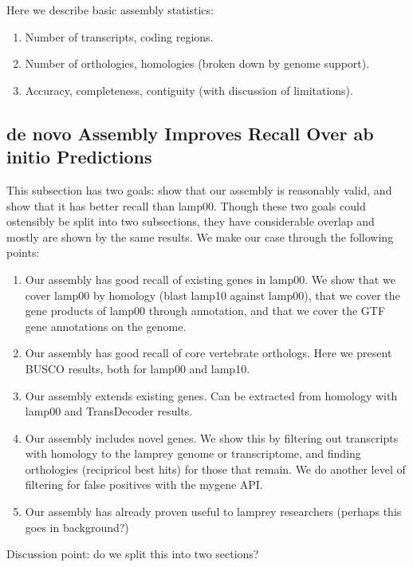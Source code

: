 \documentclass{article}
\begin{document}
Here we describe basic assembly statistics:

\begin{enumerate}

\item Number of transcripts, coding regions.
\item Number of orthologies, homologies (broken down by genome support).
\item Accuracy, completeness, contiguity (with discussion of limitations).

\end{enumerate}

\subsection*{de novo Assembly Improves Recall Over ab initio Predictions}

This subsection has two goals: show that our assembly is reasonably valid, and show that it has
better recall than lamp00. Though these two goals could ostensibly be split into two subsections, 
they have considerable overlap and mostly are shown by the same results. We make our case
through the following points:

\begin{enumerate}
\item Our assembly has good recall of existing genes in lamp00. We show that we cover lamp00 by
homology (blast lamp10 against lamp00), that we cover the gene products of lamp00 through 
annotation, and that we cover the GTF gene annotations on the genome.
\item Our assembly has good recall of core vertebrate orthologs. Here we present BUSCO results, 
both for lamp00 and lamp10.
\item Our assembly extends existing genes. Can be extracted from homology with lamp00 and 
TransDecoder results.
\item Our assembly includes novel genes. We show this by filtering out transcripts with homology 
to the lamprey genome or transcriptome, and finding orthologies (recipricol best hits) for those 
that remain. We do another level of filtering for false positives with the mygene API.
\item Our assembly has already proven useful to lamprey researchers \cite{ren_genome-wide_2015}
(perhaps this goes in background?)
\end{enumerate}

Discussion point: do we split this into two sections?
\end{document}

